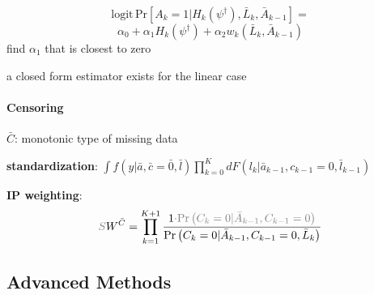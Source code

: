 \documentclass[8pt,oneside]{extarticle}
\begin{document}
\begin{multicols}{2}
$$\mathrm{logit}\,\mathrm{Pr}\left[A_k=1|H_k\left(\psi^\dagger\right), \bar{L}_k,\bar{A}_{k-1}\right]=$$
$$\alpha_0 +\alpha_1H_k\left(\psi^\dagger\right)+\alpha_2 w_k\left(\bar{L}_k,\bar{A}_{k-1}\right)
$$
find $\alpha_1$ that is closest to zero

a closed form estimator exists for the linear case



\paragraph{\large Censoring} $\bar{C}$: monotonic type of missing data 

\noindent \textbf{standardization}: $\int f(y|\bar{a}, \bar{c}{=}\bar{0}, \bar{l}) \prod_{k=0}^K dF\left(l_k|\bar{a}_{k-1}, c_{k-1} {=} 0, \bar{l}_{k-1}\right)$

\noindent \textbf{IP weighting}:
\noindent $$\textcolor{gray}{S}W^{\bar{C}}= \prod_{k=1}^{K+1}\frac{1\textcolor{gray}{\cdot \mathrm{Pr}\left(C_k=0|\bar{A}_{k-1}, C_{k-1}=0\right)}}{\mathrm{Pr}\left(C_k=0|\bar{A}_{k-1}, C_{k-1}=0, \bar{L}_k\right)} $$










\end{multicols}



\subsection{Advanced Methods}
\end{document}
